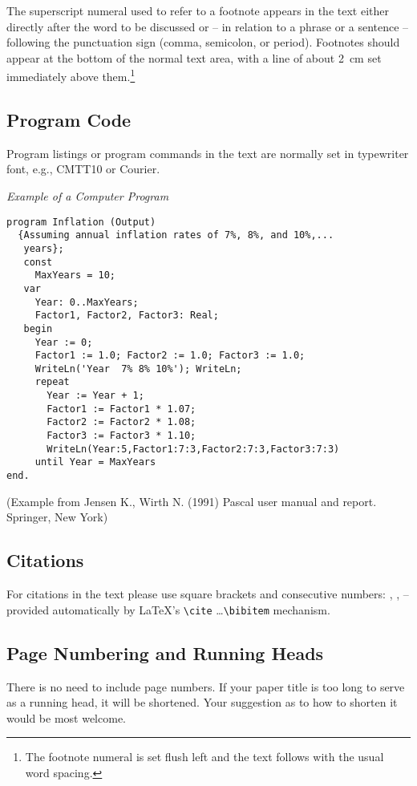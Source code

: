 \documentclass[runningheads]{llncs}
\begin{document}
{The superscript numeral used to refer to a footnote appears in the text
either directly after the word to be discussed or -- in relation to a
phrase or a sentence -- following the punctuation sign (comma,
semicolon, or period). Footnotes should appear at the bottom of
the
normal text area, with a line of about 2~cm set
immediately above them.\footnote{The footnote numeral is set flush left
and the text follows with the usual word spacing.}

\subsection{Program Code}

Program listings or program commands in the text are normally set in
typewriter font, e.g., CMTT10 or Courier.

\medskip

\noindent
{\it Example of a Computer Program}
\begin{verbatim}
program Inflation (Output)
  {Assuming annual inflation rates of 7%, 8%, and 10%,...
   years};
   const
     MaxYears = 10;
   var
     Year: 0..MaxYears;
     Factor1, Factor2, Factor3: Real;
   begin
     Year := 0;
     Factor1 := 1.0; Factor2 := 1.0; Factor3 := 1.0;
     WriteLn('Year  7% 8% 10%'); WriteLn;
     repeat
       Year := Year + 1;
       Factor1 := Factor1 * 1.07;
       Factor2 := Factor2 * 1.08;
       Factor3 := Factor3 * 1.10;
       WriteLn(Year:5,Factor1:7:3,Factor2:7:3,Factor3:7:3)
     until Year = MaxYears
end.
\end{verbatim}
%
\noindent
{\small (Example from Jensen K., Wirth N. (1991) Pascal user manual and
report. Springer, New York)}

\subsection{Citations}

For citations in the text please use
square brackets and consecutive numbers: \cite{jour}, \cite{lncschap},
\cite{proceeding1} -- provided automatically
by \LaTeX 's \verb|\cite| \dots\verb|\bibitem| mechanism.

\subsection{Page Numbering and Running Heads}

There is no need to include page numbers. If your paper title is too
long to serve as a running head, it will be shortened. Your suggestion
as to how to shorten it would be most welcome.

}
\end{document}
